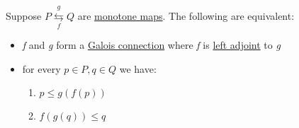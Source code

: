 
Suppose $P \overset{g}{\underset{f}{\leftrightarrows}} Q$ are \href{doc/1 math/Seven Sketches in Compositionality/Chapter 1: Generative Effects/4 Monotone maps/1 Monotone map}{monotone maps}. The following are equivalent:
    \begin{itemize}
      \item \emph{f} and \emph{g} form a \href{doc/1 math/Seven Sketches in Compositionality/Chapter 1: Generative Effects/6 Galois connections/1 Definition and examples/Galois connection}{Galois connection} where \emph{f} is \href{doc/1 math/Seven Sketches in Compositionality/Chapter 1: Generative Effects/6 Galois connections/1 Definition and examples/Galois connection}{left adjoint} to \emph{g}
      \item for every $p \in P, q \in Q$ we have:
            \begin{enumerate}
              \item $p \leq g(f(p))$
              \item $f(g(q)) \leq q$
            \end{enumerate}

    \end{itemize}